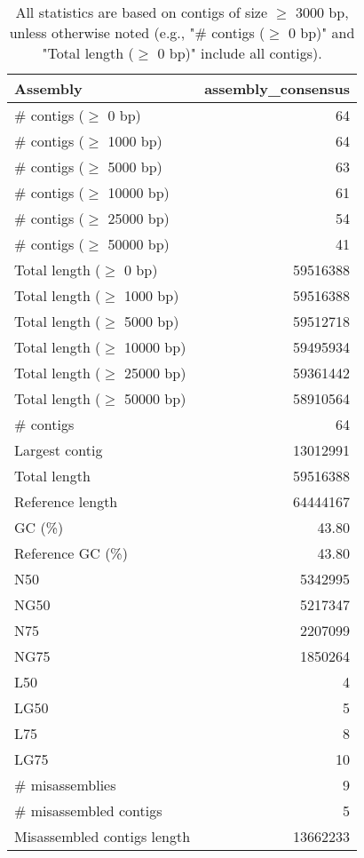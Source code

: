 \documentclass[12pt,a4paper]{article}
\begin{document}
\begin{table}[ht]
\begin{center}
\caption{All statistics are based on contigs of size $\geq$ 3000 bp, unless otherwise noted (e.g., "\# contigs ($\geq$ 0 bp)" and "Total length ($\geq$ 0 bp)" include all contigs).}
\begin{tabular}{|l*{1}{|r}|}
\hline
Assembly & assembly\_consensus \\ \hline
\# contigs ($\geq$ 0 bp) & 64 \\ \hline
\# contigs ($\geq$ 1000 bp) & 64 \\ \hline
\# contigs ($\geq$ 5000 bp) & 63 \\ \hline
\# contigs ($\geq$ 10000 bp) & 61 \\ \hline
\# contigs ($\geq$ 25000 bp) & 54 \\ \hline
\# contigs ($\geq$ 50000 bp) & 41 \\ \hline
Total length ($\geq$ 0 bp) & 59516388 \\ \hline
Total length ($\geq$ 1000 bp) & 59516388 \\ \hline
Total length ($\geq$ 5000 bp) & 59512718 \\ \hline
Total length ($\geq$ 10000 bp) & 59495934 \\ \hline
Total length ($\geq$ 25000 bp) & 59361442 \\ \hline
Total length ($\geq$ 50000 bp) & 58910564 \\ \hline
\# contigs & 64 \\ \hline
Largest contig & 13012991 \\ \hline
Total length & 59516388 \\ \hline
Reference length & 64444167 \\ \hline
GC (\%) & 43.80 \\ \hline
Reference GC (\%) & 43.80 \\ \hline
N50 & 5342995 \\ \hline
NG50 & 5217347 \\ \hline
N75 & 2207099 \\ \hline
NG75 & 1850264 \\ \hline
L50 & 4 \\ \hline
LG50 & 5 \\ \hline
L75 & 8 \\ \hline
LG75 & 10 \\ \hline
\# misassemblies & 9 \\ \hline
\# misassembled contigs & 5 \\ \hline
Misassembled contigs length & 13662233 \\ \hline

\end{tabular}
\end{center}
\end{table}
\end{document}
